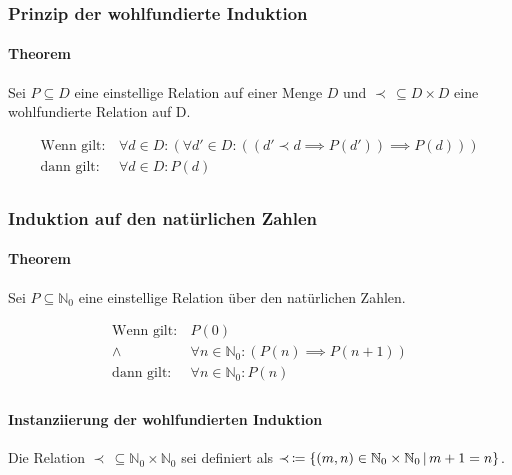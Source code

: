 			\subsubsection{Prinzip der wohlfundierte Induktion}
				\paragraph{Theorem}
					Sei $ P \subseteq D $ eine einstellige Relation auf einer Menge $ D $ und $ \prec \,\subseteq D \times D $ eine wohlfundierte Relation auf D.

					\begin{align*}
						\text{Wenn gilt:} & \,\forall d \in D : (\forall d' \in D : ((d' \prec d \implies P(d')) \implies P(d))) \\
						\text{dann gilt:} & \,\forall d \in D : P(d)                                                             \\
					\end{align*}


			\subsubsection{Induktion auf den natürlichen Zahlen}
				\paragraph{Theorem}
					Sei $ P \subseteq \mathbb{N} _ 0 $ eine einstellige Relation über den natürlichen Zahlen.

					\begin{align*}
						\text{Wenn gilt:} & \,P(0)                                                    \\
						\land             & \,\forall n \in \mathbb{N} _ 0 : (P(n) \implies P(n + 1)) \\
						\text{dann gilt:} & \,\forall n \in \mathbb{N} _ 0 : P(n)                     \\
					\end{align*}

				\paragraph{Instanziierung der wohlfundierten Induktion}
					Die Relation $ \prec \,\subseteq \mathbb{N} _ 0 \times \mathbb{N} _ 0 $ sei definiert als $ \prec \,\coloneqq \{ (m, n) \in \mathbb{N} _ 0 \times \mathbb{N} _ 0 \,\vert\, m + 1 = n \} $.

